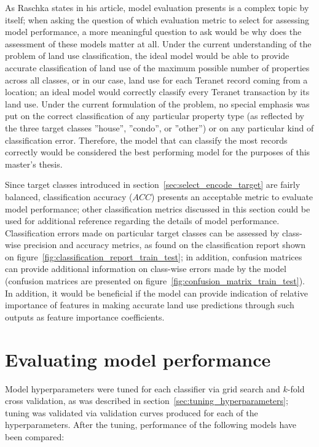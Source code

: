 As Raschka states in his article\cite{Raschka2018}, model evaluation presents is a complex topic by itself;
when asking the question of which evaluation metric to select for assessing model performance, a more meaningful question to ask would be why does the assessment of these models matter at all.
Under the current understanding of the problem of land use classification, the ideal model would be able to provide accurate classification of land use of the maximum possible number of properties across all classes, or in our case, land use for each Teranet record coming from a location;
an ideal model would correctly classify every Teranet transaction by its land use.
Under the current formulation of the problem, no special emphasis was put on the correct classification of any particular property type (as reflected by the three target classes ''house'', ''condo'', or ''other'') or on any particular kind of classification error.
Therefore, the model that can classify the most records correctly would be considered the best performing model for the purposes of this master's thesis.

Since target classes introduced in section~\ref{sec:select_encode_target} are fairly balanced, classification accuracy ($ACC$) presents an acceptable metric to evaluate model performance;
other classification metrics discussed in this section could be used for additional reference regarding the details of model performance.
Classification errors made on particular target classes can be assessed by class-wise precision and accuracy metrics, as found on the classification report shown on figure~\ref{fig:classification_report_train_test};
in addition, confusion matrices can provide additional information on class-wise errors made by the model (confusion matrices are presented on figure~\ref{fig:confusion_matrix_train_test}).
In addition, it would be beneficial if the model can provide indication of relative importance of features in making accurate land use predictions through such outputs as feature importance coefficients.

\section{Evaluating model performance} \label{sec:model_performance}

Model hyperparameters were tuned for each classifier via grid search and $k$-fold cross validation, as was described in section~\ref{sec:tuning_hyperparameters};
tuning was validated via validation curves produced for each of the hyperparameters.
After the tuning, performance of the following models have been compared:

